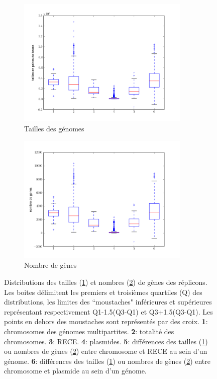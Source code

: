 \begin{figure}[H]
	\hspace{-2cm}
	\begin{subfigure}{0.6\textwidth}
		\centering
		\includegraphics[width=0.9\textwidth]{./img/replicon_mustach.png}
		\caption{Tailles des génomes}\label{taille}
	\end{subfigure}
	\begin{subfigure}{0.6\textwidth}
		\centering
		\includegraphics[width=0.9\textwidth]{./img/gene_mustach.png}
		\caption{Nombre de gènes}\label{nbgene}
	\end{subfigure}
	\caption[Distributions des tailles et nombres de gènes des réplicons]{Distributions des tailles (\ref{taille}) et nombres (\ref{nbgene}) de gènes des réplicons. \\
	Les boites délimitent les premiers et troisièmes quartiles (Q) des distributions, les limites des ``moustaches" inférieures et supérieures représentant respectivement Q1-1.5(Q3-Q1) et Q3+1.5(Q3-Q1). Les points en dehors des moustaches sont représentés par des croix. \textbf{1}: chromosomes des génomes multipartites. \textbf{2}: totalité des chromosomes. \textbf{3}: RECE. \textbf{4}: plasmides. \textbf{5}: différences des tailles (\ref{taille}) ou nombres de gènes (\ref{nbgene}) entre chromosome et RECE au sein d'un génome. \textbf{6}: différences des tailles (\ref{taille}) ou nombres de gènes (\ref{nbgene}) entre chromosome et plasmide au sein d'un génome.}\label{figsize}
\end{figure} 

